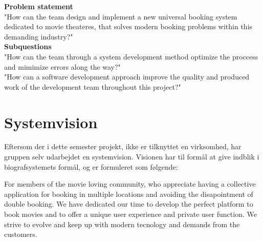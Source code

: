 \textbf{Problem statement} \\
"How can the team design and implement a new universal booking system dedicated to movie theateres, 
that solves modern booking problems within this demanding industry?" \\

\textbf{Subquestions} \\
"How can the team through a system development method optimize the proccess and mimimize errors along the way?" \\

"How can a software development approach improve the quality and produced work of the development team throughout this project?"

\section{Systemvision}
Eftersom der i dette semester projekt, ikke er tilknyttet en virksomhed, har gruppen selv udarbejdet en systemvision.
Visionen har til formål at give indblik i biografsystemets formål, og er formuleret som følgende:

For members of the movie loving community, who appreciate having a collective application for booking 
in multiple locations and avoiding the disapointment of double booking. We have dedicated our 
time to develop the perfect platform to book movies and to offer a unique user experience and private user function. 
We strive to evolve and keep up with modern tecnology and demands from the customers. \\



